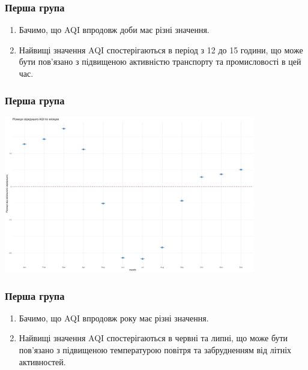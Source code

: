 \documentclass{beamer}
\begin{document}
\begin{frame}
  \frametitle{Перша група}

  \begin{enumerate}
    \item Бачимо, що AQI впродовж доби має різні значення.
    \item Найвищі значення AQI спостерігаються в період з 12 до 15 години, 
    що може бути пов'язано з підвищеною активністю транспорту та промисловості в цей час.
  
  \end{enumerate}
\end{frame}

\begin{frame}
  \frametitle{Перша група}

  \begin{center}
    \includegraphics[height=2.7in]{./plots/lab2/1-4-part/seasonal_summary.png}
  \end{center}

\end{frame}

\begin{frame}
  \frametitle{Перша група}

  \begin{enumerate}
    \item  Бачимо, що AQI впродовж року має різні значення.
    \item Найвищі значення AQI спостерігаються в червні та липні, 
    що може бути пов'язано з підвищеною температурою повітря та забрудненням від 
    літніх активностей.
  
  \end{enumerate}
\end{frame}

\end{document}
